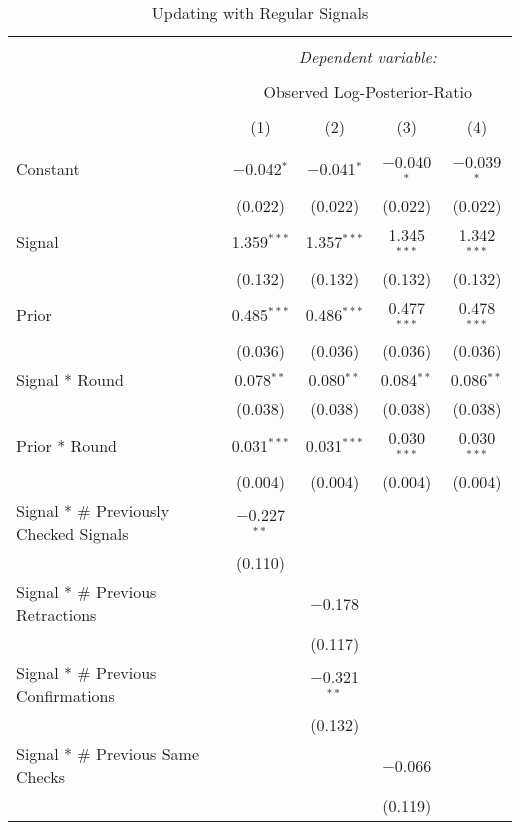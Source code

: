 
\begin{table}[!htbp] \centering \small
  \caption{Updating with Regular Signals} 
  \label{tab:regular_verifications_llr} 
\begin{tabular}{@{\extracolsep{5pt}}lcccc} 
\\[-1.8ex]\hline 
\hline \\[-1.8ex] 
 & \multicolumn{4}{c}{\textit{Dependent variable:}} \\ 
\cline{2-5} 
\\[-1.8ex] & \multicolumn{4}{c}{Observed Log-Posterior-Ratio} \\ 
\\[-1.8ex] & (1) & (2) & (3) & (4)\\ 
\hline \\[-1.8ex] 
 Constant & $-$0.042$^{*}$ & $-$0.041$^{*}$ & $-$0.040$^{*}$ & $-$0.039$^{*}$ \\ 
  & (0.022) & (0.022) & (0.022) & (0.022) \\ 
  Signal & 1.359$^{***}$ & 1.357$^{***}$ & 1.345$^{***}$ & 1.342$^{***}$ \\ 
  & (0.132) & (0.132) & (0.132) & (0.132) \\ 
  Prior & 0.485$^{***}$ & 0.486$^{***}$ & 0.477$^{***}$ & 0.478$^{***}$ \\ 
  & (0.036) & (0.036) & (0.036) & (0.036) \\ 
  Signal * Round & 0.078$^{**}$ & 0.080$^{**}$ & 0.084$^{**}$ & 0.086$^{**}$ \\ 
  & (0.038) & (0.038) & (0.038) & (0.038) \\ 
  Prior * Round & 0.031$^{***}$ & 0.031$^{***}$ & 0.030$^{***}$ & 0.030$^{***}$ \\ 
  & (0.004) & (0.004) & (0.004) & (0.004) \\ 
  Signal * \# Previously Checked Signals & $-$0.227$^{**}$ &  &  &  \\ 
  & (0.110) &  &  &  \\ 
  Signal * \# Previous Retractions &  & $-$0.178 &  &  \\ 
  &  & (0.117) &  &  \\ 
  Signal * \# Previous Confirmations &  & $-$0.321$^{**}$ &  &  \\ 
  &  & (0.132) &  &  \\ 
  Signal * \# Previous Same Checks &  &  & $-$0.066 &  \\ 
  &  &  & (0.119) &  \\ 

\end{tabular}
\end{table}
